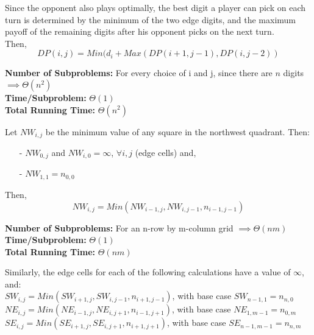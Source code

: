 \documentclass[12pt,twoside]{article}
\begin{document}
\begin{problems}
\begin{problemparts}
Since the opponent also plays optimally, the best digit a player can pick on each turn is determined by the minimum of the two edge digits, and the maximum payoff of the remaining digits after his opponent picks on the next turn.  \\


Then, \[ DP(i,j) = Min(d_i + Max(DP(i+1,j-1),DP(i, j-2)) \]

\textbf{Number of Subproblems:} For every choice of i and j, since there are $n$ digits $\implies \Theta(n^2)$\\

\textbf{Time/Subproblem:} $\Theta(1)$\\

\textbf{Total Running Time:} $\Theta(n^2)$

\end{problemparts}

\problem   %

\begin{problemparts}
\problempart Let $NW_{i,j}$ be the minimum value of any square in the northwest quadrant. 
Then:
\begin{itemize}
	\item [-] $NW_{0,j}$ and $NW_{i,0} = \infty$,  $ \forall i, j$ (edge cells) and,  
	\item [-] $NW_{1,1} = n_{0,0}$
\end{itemize} 
Then, 
\[ NW_{i,j} = Min(NW_{i-1 , j}, NW_{i, j-1}, n_{i-1,j-1}) \]

\textbf{Number of Subproblems:} For an n-row by m-column grid $\implies \Theta(nm)$\\

\textbf{Time/Subproblem:} $\Theta(1)$\\

\textbf{Total Running Time:} $\Theta(nm)$


\problempart  Similarly, the edge cells for each of the following calculations have a value of $\infty$, and: \\

$SW_{i,j} = Min(SW_{i+1 , j}, SW_{i, j-1}, n_{i+1, j-1})$, with base case $SW_{n-1,1}= n_{n,0}$\\

$NE_{i,j} = Min(NE_{i-1 , j}, NE_{i, j+1}, n_{i-1, j+1})$, with base case $NE_{1,m-1}= n_{0,m}$\\

$SE_{i,j} = Min(SE_{i+1 , j}, SE_{i, j+1}, n_{i+1, j+1})$, with base case $SE_{n-1,m-1}= n_{n,m}$\\




\end{problemparts}
\end{problems}
\end{document}
